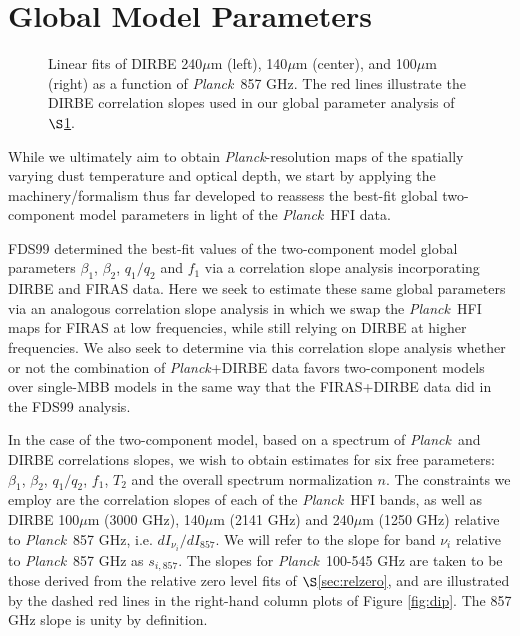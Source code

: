 \documentclass{emulateapj}
\newcommand{\PLANCK}{{\it Planck}}
\begin{document}




\section{Global Model Parameters}
\label{sec:global}

\begin{figure*}
\begin{center}
\caption{\label{fig:dirbe_slopes} Linear fits of DIRBE 240$\mu$m (left), 
140$\mu$m (center), and 100$\mu$m (right) as a function of \PLANCK~857 GHz. The
red lines illustrate the DIRBE correlation slopes used in our global parameter 
analysis of $\S$\ref{sec:global}.}
\end{center}
\end{figure*}

While we ultimately aim to obtain \PLANCK-resolution maps of the spatially 
varying dust temperature and optical depth, we start by applying the 
machinery/formalism thus far developed to reassess the best-fit global 
two-component model parameters in light of the \PLANCK~HFI data.

FDS99 determined the best-fit values of the two-component model global 
parameters $\beta_1$, $\beta_2$, $q_1/q_2$ and $f_1$ via a correlation slope
analysis incorporating DIRBE and FIRAS data. Here we seek to estimate these 
same global parameters via an analogous correlation slope analysis in which we 
swap the \PLANCK~HFI maps for FIRAS at low frequencies, while still relying on 
DIRBE at higher frequencies. We also seek to determine via this correlation 
slope analysis whether or not the combination of \PLANCK+DIRBE data favors 
two-component models over single-MBB models in the same way that the 
FIRAS+DIRBE data did in the FDS99 analysis.

In the case of the two-component model, based on a spectrum of \PLANCK~and 
DIRBE correlations slopes, we wish to obtain estimates for six free parameters:
$\beta_1$, $\beta_2$, $q_1/q_2$, $f_1$, $T_2$ and the overall spectrum 
normalization $n$. The constraints we employ are the correlation slopes of each
of the \PLANCK~HFI bands, as well as DIRBE 100$\mu$m (3000 GHz), 140$\mu$m 
(2141 GHz) and 240$\mu$m (1250 GHz) relative to \PLANCK~857 GHz, i.e. 
$dI_{\nu_i}/dI_{857}$. We will refer to the slope for band $\nu_i$ relative to 
\PLANCK~857 GHz as $s_{i,857}$. The slopes for \PLANCK~100-545 GHz are taken 
to be those derived from the relative zero level fits of $\S$\ref{sec:relzero},
and are illustrated by the dashed red lines in the right-hand column plots of 
Figure \ref{fig:dip}. The 857 GHz slope is unity by definition.
\end{document}
